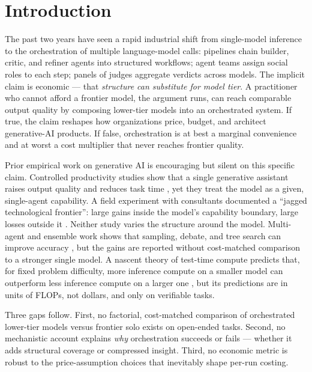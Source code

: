 \documentclass[12pt,a4paper]{article}
\begin{document}
\section{Introduction}\label{sec:intro}

The past two years have seen a rapid industrial shift from single-model
inference to the orchestration of multiple language-model calls: pipelines
chain builder, critic, and refiner agents into structured workflows; agent
teams assign social roles to each step; panels of judges aggregate verdicts
across models. The implicit claim is economic --- that \emph{structure can
substitute for model tier}. A practitioner who cannot afford a frontier model,
the argument runs, can reach comparable output quality by composing lower-tier
models into an orchestrated system. If true, the claim reshapes how
organizations price, budget, and architect generative-AI products. If false,
orchestration is at best a marginal convenience and at worst a cost multiplier
that never reaches frontier quality.

Prior empirical work on generative AI is encouraging but silent on this
specific claim. Controlled productivity studies show that a single generative
assistant raises output quality and reduces task time \citep{NoyZhang2023,
BrynjolfssonLiRaymond2023}, yet they treat the model as a given, single-agent
capability. A field experiment with consultants documented a ``jagged
technological frontier'': large gains inside the model's capability boundary,
large losses outside it \citep{DellAcquaEtAl2023}. Neither study varies the
structure around the model. Multi-agent and ensemble work shows that sampling,
debate, and tree search can improve accuracy \citep{WangEtAl2023,
LiangEtAl2024, YaoEtAl2023}, but the gains are reported without cost-matched
comparison to a stronger single model. A nascent theory of test-time compute
predicts that, for fixed problem difficulty, more inference compute on a
smaller model can outperform less inference compute on a larger one
\citep{SnellEtAl2024}, but its predictions are in units of FLOPs, not dollars,
and only on verifiable tasks.

Three gaps follow. First, no factorial, cost-matched comparison of orchestrated
lower-tier models versus frontier solo exists on open-ended tasks. Second, no
mechanistic account explains \emph{why} orchestration succeeds or fails ---
whether it adds structural coverage or compressed insight. Third, no economic
metric is robust to the price-assumption choices that inevitably shape per-run
costing.
\end{document}
